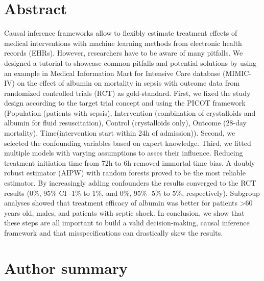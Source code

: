 \documentclass[10pt,letterpaper]{article}
\begin{document}
\section*{Abstract}

Causal inference frameworks allow to flexibly estimate treatment effects of
medical interventions with machine learning methods from electronic health
records (EHRs). However, researchers have to be aware of many pitfalls. We
designed a tutorial to showcase common pitfalls and potential solutions by using
an example in Medical Information Mart for Intensive Care database (MIMIC-IV) on
the effect of albumin on mortality in sepsis with outcome data from randomized
controlled trials (RCT) as gold-standard. First, we fixed the study design
according to the target trial concept and using the PICOT framework (Population
(patients with sepsis), Intervention (combination of crystalloids and albumin
for fluid resuscitation), Control (crystalloids only), Outcome (28-day
mortality), Time(intervention start within 24h of admission)). Second, we
selected the confounding variables based on expert knowledge. Third, we fitted
multiple models with varying assumptions to asses their influence. Reducing
treatment initiation time from 72h to 6h removed immortal time bias. A doubly
robust estimator (AIPW) with random forests proved to be the most reliable
estimator. By increasingly adding confounders the results converged to the RCT
results (0\%, 95\% CI -1\% to 1\%, and 0\%, 95\% -5\% to 5\%, respectively).
Subgroup analyses showed that treatment efficacy of albumin was better for
patients >60 years old, males, and patients with septic shock. In conclusion, we
show that these steps are all important to build a valid decision-making, causal
inference framework and that misspecifications can drastically skew the results.

\section*{Author summary}
\end{document}
